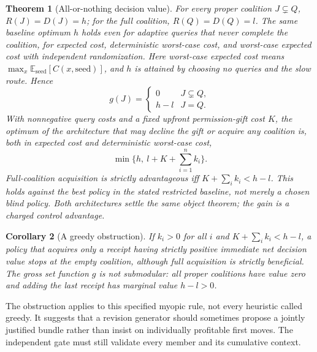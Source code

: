 \documentclass[11pt,letterpaper]{article}
\newtheorem{theorem}{Theorem}[section]\newtheorem{proposition}[theorem]{Proposition}\newtheorem{corollary}[theorem]{Corollary}\newtheorem{definition}[theorem]{Definition}
\begin{document}
\begin{theorem}[All-or-nothing decision value]\label{thm:parity}
For every proper coalition $J\subsetneq Q$, $R(J)=D(J)=h$; for the full coalition, $R(Q)=D(Q)=l$. The same baseline optimum $h$ holds even for adaptive queries that never complete the coalition, for expected cost, deterministic worst-case cost, and worst-case expected cost with independent randomization. Here worst-case expected cost means $\max_x\mathbb E_{\mathrm{seed}}[C(x,\mathrm{seed})]$, and $h$ is attained by choosing no queries and the slow route. Hence
\[
 g(J)=\begin{cases}0&J\subsetneq Q,\\h-l&J=Q.\end{cases}
\]
With nonnegative query costs and a fixed upfront permission-gift cost $K$, the optimum of the architecture that may decline the gift or acquire any coalition is, both in expected cost and deterministic worst-case cost,
\[
 \boxed{\min\{h,\ l+K+\textstyle\sum_{i=1}^n k_i\}.}
\]
Full-coalition acquisition is strictly advantageous iff $K+\sum_i k_i<h-l$. This holds against the best policy in the stated restricted baseline, not merely a chosen blind policy. Both architectures settle the same object theorem; the gain is a charged control advantage.
\end{theorem}
\begin{corollary}[A greedy obstruction]\label{cor:greedy}
If $k_i>0$ for all $i$ and $K+\sum_i k_i<h-l$, a policy that acquires only a receipt having strictly positive immediate net decision value stops at the empty coalition, although full acquisition is strictly beneficial. The gross set function $g$ is not submodular: all proper coalitions have value zero and adding the last receipt has marginal value $h-l>0$.
\end{corollary}
The obstruction applies to this specified myopic rule, not every heuristic called greedy. It suggests that a revision generator should sometimes propose a jointly justified bundle rather than insist on individually profitable first moves. The independent gate must still validate every member and its cumulative context.
\end{document}
